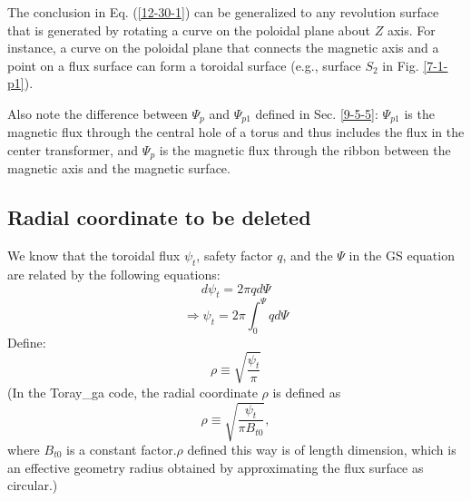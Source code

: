 \documentclass{llncs}
\begin{document}
The conclusion in Eq. (\ref{12-30-1}) can be generalized to any revolution
surface that is generated by rotating a curve on the poloidal plane about $Z$
axis. For instance, a curve on the poloidal plane that connects the magnetic
axis and a point on a flux surface can form a toroidal surface (e.g., surface
$S_2$ in Fig. \ref{7-1-p1}).

Also note the difference between $\Psi_p$ and $\Psi_{p 1}$ defined in Sec.
\ref{9-5-5}: $\Psi_{p 1}$ is the magnetic flux through the central hole of a
torus and thus includes the flux in the center transformer, and $\Psi_p$ is
the magnetic flux through the ribbon between the magnetic axis and the
magnetic surface.

\subsection{Radial coordinate to be deleted}

We know that the toroidal flux $\psi_t$, safety factor $q$, and the $\Psi$ in
the GS equation are related by the following equations:
\begin{equation}
  d \psi_t = 2 \pi q d \Psi
\end{equation}
\begin{equation}
  \Longrightarrow \psi_t = 2 \pi \int_0^{\Psi} q d \Psi
\end{equation}
Define:
\begin{equation}
  \label{5-26-1} \rho \equiv \sqrt{\frac{\psi_t}{\pi}}
\end{equation}
(In the Toray\_ga code, the radial coordinate $\rho$ is defined as
\begin{equation}
  \label{3-21-a1} \rho \equiv \sqrt{\frac{\psi_t}{\pi B_{t 0}}},
\end{equation}
where $B_{t 0}$ is a constant factor.$\rho$ defined this way is of length
dimension, which is an effective geometry radius obtained by approximating the
flux surface as circular.)

\
\end{document}
